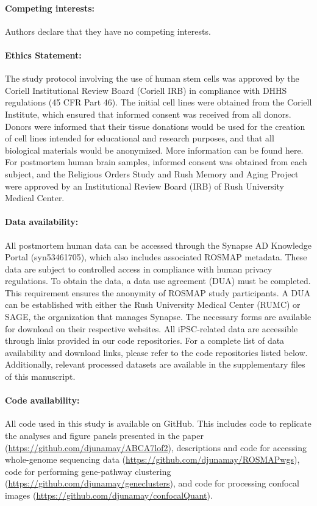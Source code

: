 \paragraph{Competing interests:} Authors declare that they have no competing interests.


\paragraph{Ethics Statement:} The study protocol involving the use of human stem cells was approved by the Coriell Institutional Review Board (Coriell IRB) in compliance with DHHS regulations (45 CFR Part 46). The initial cell lines were obtained from the Coriell Institute, which ensured that informed consent was received from all donors. Donors were informed that their tissue donations would be used for the creation of cell lines intended for educational and research purposes, and that all biological materials would be anonymized. More information can be found here. For postmortem human brain samples, informed consent was obtained from each subject, and the Religious Orders Study and Rush Memory and Aging Project were approved by an Institutional Review Board (IRB) of Rush University Medical Center.


\paragraph{Data availability:} All postmortem human data can be accessed through the Synapse AD Knowledge Portal (syn53461705), which also includes associated ROSMAP metadata. These data are subject to controlled access in compliance with human privacy regulations. To obtain the data, a data use agreement (DUA) must be completed. This requirement ensures the anonymity of ROSMAP study participants. A DUA can be established with either the Rush University Medical Center (RUMC) or SAGE, the organization that manages Synapse. The necessary forms are available for download on their respective websites. All iPSC-related data are accessible through links provided in our code repositories. For a complete list of data availability and download links, please refer to the code repositories listed below. Additionally, relevant processed datasets are available in the supplementary files of this manuscript.


\paragraph{Code availability:} All code used in this study is available on GitHub. This includes code to replicate the analyses and figure panels presented in the paper (\url{https://github.com/djunamay/ABCA7lof2}), descriptions and code for accessing whole-genome sequencing data (\url{https://github.com/djunamay/ROSMAPwgs}), code for performing gene-pathway clustering (\url{https://github.com/djunamay/geneclusters}), and code for processing confocal images (\url{https://github.com/djunamay/confocalQuant}).
